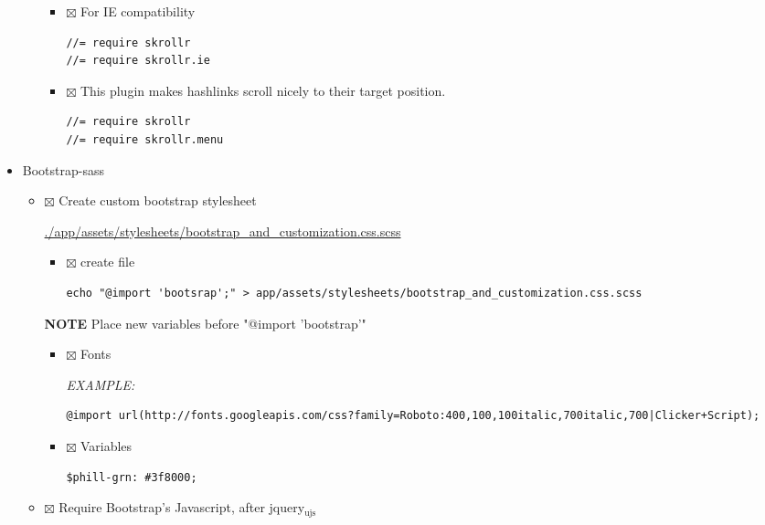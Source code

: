\documentclass[11pt]{article}
\begin{document}
\begin{itemize}
\begin{itemize}
\begin{itemize}
\item $\boxtimes$ For IE compatibility

\begin{verbatim}
//= require skrollr
//= require skrollr.ie
\end{verbatim}

\item $\boxtimes$ This plugin makes hashlinks scroll nicely to their target position.

\begin{verbatim}
//= require skrollr
//= require skrollr.menu
\end{verbatim}
\end{itemize}
\end{itemize}

\item Bootstrap-sass
\label{sec-1-3-2-2}

\begin{itemize}
\item $\boxtimes$ Create custom bootstrap stylesheet

\url{./app/assets/stylesheets/bootstrap_and_customization.css.scss}

\begin{itemize}
\item $\boxtimes$ create file

\begin{verbatim}
echo "@import 'bootsrap';" > app/assets/stylesheets/bootstrap_and_customization.css.scss
\end{verbatim}
\end{itemize}
\textbf{NOTE} Place new variables before "@import 'bootstrap'"

\begin{itemize}
\item $\boxtimes$ Fonts

\emph{EXAMPLE:}
\begin{verbatim}
@import url(http://fonts.googleapis.com/css?family=Roboto:400,100,100italic,700italic,700|Clicker+Script);
\end{verbatim}

\item $\boxtimes$ Variables

\begin{verbatim}
$phill-grn: #3f8000;
\end{verbatim}
\end{itemize}

\item $\boxtimes$ Require Bootstrap's Javascript, after jquery$_{\text{ujs}}$ 


\end{itemize}
\end{itemize}
\end{document}
